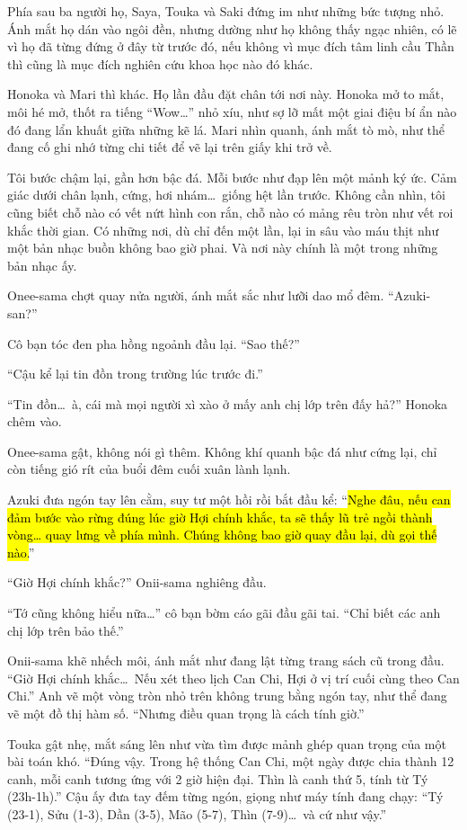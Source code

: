 \documentclass[../main.tex]{subfiles}
\begin{document}
Phía sau ba người họ, Saya, Touka và Saki đứng im như những bức tượng nhỏ. Ánh mắt họ dán vào ngôi đền, nhưng dường như họ không thấy ngạc nhiên, có lẽ vì họ đã từng đứng ở đây từ trước đó, nếu không vì mục đích tâm linh cầu Thần thì cũng là mục đích nghiên cứu khoa học nào đó khác.

Honoka và Mari thì khác. Họ lần đầu đặt chân tới nơi này. Honoka mở to mắt, môi hé mở, thốt ra tiếng ``Wow\dots'' nhỏ xíu, như sợ lỡ mất một giai điệu bí ẩn nào đó đang lẩn khuất giữa những kẽ lá. Mari nhìn quanh, ánh mắt tò mò, như thể đang cố ghi nhớ từng chi tiết để vẽ lại trên giấy khi trở về.

Tôi bước chậm lại, gần hơn bậc đá. Mỗi bước như đạp lên một mảnh ký ức. Cảm giác dưới chân lạnh, cứng, hơi nhám\dots\ giống hệt lần trước. Không cần nhìn, tôi cũng biết chỗ nào có vết nứt hình con rắn, chỗ nào có mảng rêu tròn như vết roi khắc thời gian. Có những nơi, dù chỉ đến một lần, lại in sâu vào máu thịt như một bản nhạc buồn không bao giờ phai. Và nơi này chính là một trong những bản nhạc ấy.

Onee-sama chợt quay nửa người, ánh mắt sắc như lưỡi dao mổ đêm. ``Azuki-san?''

Cô bạn tóc đen pha hồng ngoảnh đầu lại. ``Sao thế?''

``Cậu kể lại tin đồn trong trường lúc trước đi.''

``Tin đồn\dots\ à, cái mà mọi người xì xào ở mấy anh chị lớp trên đấy hả?'' Honoka chêm vào.

Onee-sama gật, không nói gì thêm. Không khí quanh bậc đá như cứng lại, chỉ còn tiếng gió rít của buổi đêm cuối xuân lành lạnh.

Azuki đưa ngón tay lên cằm, suy tư một hồi rồi bắt đầu kể: ``\hl{Nghe đâu, nếu can đảm bước vào rừng đúng lúc giờ Hợi chính khắc, ta sẽ thấy lũ trẻ ngồi thành vòng\dots{} quay lưng về phía mình. Chúng không bao giờ quay đầu lại, dù gọi thế nào.}''

``Giờ Hợi chính khắc?'' Onii-sama nghiêng đầu.

``Tớ cũng không hiểu nữa\dots'' cô bạn bờm cáo gãi đầu gãi tai. ``Chỉ biết các anh chị lớp trên bảo thế.''

Onii-sama khẽ nhếch môi, ánh mắt như đang lật từng trang sách cũ trong đầu. ``Giờ Hợi chính khắc\dots\ Nếu xét theo lịch Can Chi, Hợi ở vị trí cuối cùng theo Can Chi.'' Anh vẽ một vòng tròn nhỏ trên không trung bằng ngón tay, như thể đang vẽ một đồ thị hàm số. ``Nhưng điều quan trọng là cách tính giờ.''

Touka gật nhẹ, mắt sáng lên như vừa tìm được mảnh ghép quan trọng của một bài toán khó. ``Đúng vậy. Trong hệ thống Can Chi, một ngày được chia thành 12 canh, mỗi canh tương ứng với 2 giờ hiện đại. Thìn là canh thứ 5, tính từ Tý (23h-1h).'' Cậu ấy đưa tay đếm từng ngón, giọng như máy tính đang chạy: ``Tý (23-1), Sửu (1-3), Dần (3-5), Mão (5-7), Thìn (7-9)\dots\ và cứ như vậy.''
\end{document}
